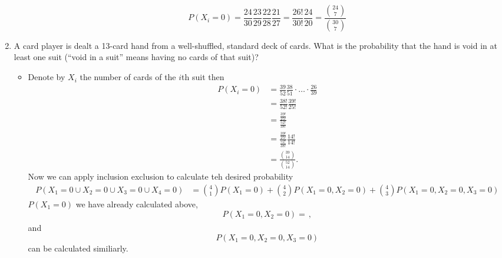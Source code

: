 \documentclass{article}
\begin{document}
\begin{enumerate}
\begin{itemize}
			$$
			P(X_i = 0) = \frac{24}{30} \frac{23}{29} \frac{22}{28} \frac{21}{27} = \frac{26!}{30!} \frac{24}{20} = \frac{\binom{24}{7}}{\binom{30}{7}}
			$$
		\end{itemize}
	\item A card player is dealt a 13-card hand from a well-shuffled, standard deck of cards. What is the probability that the hand is void in at least one suit (“void in a suit” means having no cards of that suit)?
		\begin{itemize}
			\item Denote by $X_i$ the number of cards of the $i$th suit then
			$$
			\begin{aligned}
			P(X_i = 0) &= \frac{39}{52} \frac{38}{51} \cdot \dots \cdot \frac{26}{39} \\
			&= \frac{38!}{52!} \frac{39!}{25!} \\
			&= \frac{\frac{39!}{25!}}{\frac{52!}{38!}} \\
			&= \frac{\frac{39!}{25!}}{\frac{52!}{38!}} \frac{14!}{14!} \\
			&= \frac{\binom{39}{14}}{\binom{52}{14}}.
			\end{aligned}
			$$
			Now we can apply inclusion exclusion to calculate teh desired probability
			$$
			\begin{aligned}
			P(X_1 = 0 \cup X_2 = 0 \cup X_3 = 0 \cup X_4 = 0) &= \binom{4}{1} P(X_1 = 0) + \binom{4}{2} P(X_1 = 0, X_2 = 0) + \binom{4}{3} P(X_1 = 0, X_2 = 0, X_3 = 0)
			\end{aligned}
			$$
			$P(X_1 = 0)$ we have already calculated above,
			$$P(X_1 = 0, X_2 = 0) = \frac{}{},$$
			and
			$$
			P(X_1 = 0, X_2 = 0, X_3 = 0)
			$$
			can be calculated similiarly.
		\end{itemize}
\end{enumerate}
\end{document}
